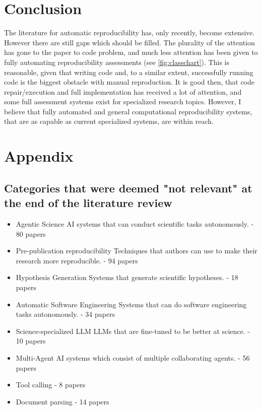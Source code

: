 \documentclass[8pt,a4paper]{article}
\begin{document}

\section{Conclusion}
The literature for automatic reproducibility has, only recently, become extensive. However there are still gaps which should be filled.
The plurality of the attention has gone to the paper to code problem, and much less attention has been given to fully automating
reproducibility assessments (see \autoref{fig:classchart}). This is reasonable, given that writing code and, to a similar extent, 
successfully running code is the biggest obstacle with manual reproduction.
It is good then, that code repair/execution and full implementation has received a lot of attention, 
and some full assessment systems exist for specialized research topics.
However, I believe that fully automated and general computational reproducibility systems, that are as capable as current specialized systems, are within reach.

\printbibliography

\newpage
\section*{Appendix}
\subsection*{Categories that were deemed "not relevant" at the end of the literature review}\label{sec:notrelevantcategories}
\begin{itemize}\label{}
    \item Agentic Science \subitem AI systems that can conduct scientific tasks autonomously. - 80 papers
    \item Pre-publication reproducibility \subitem Techniques that authors can use to make their research more reproducible. - 94 papers
    \item Hypothesis Generation \subitem Systems that generate scientific hypotheses. - 18 papers
    \item Automatic Software Engineering \subitem Systems that can do software engineering tasks autonomously. - 34 papers
    \item Science-specialized LLM \subitem LLMs that are fine-tuned to be better at science. - 10 papers
    \item Multi-Agent \subitem AI systems which consist of multiple collaborating agents. - 56 papers
    \item Tool calling - 8 papers
    \item Document parsing - 14 papers
\end{itemize}
\end{document}
